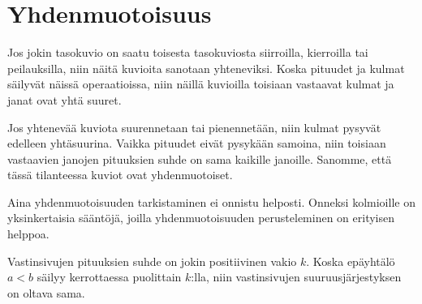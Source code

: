 \section*{Yhdenmuotoisuus}

Jos jokin tasokuvio on saatu toisesta tasokuviosta siirroilla, kierroilla tai
peilauksilla, niin näitä kuvioita sanotaan yhteneviksi. Koska pituudet ja kulmat säilyvät
näissä operaatioissa, niin näillä kuvioilla toisiaan vastaavat kulmat ja janat
ovat yhtä suuret.

Jos yhtenevää kuviota suurennetaan tai pienennetään, niin kulmat pysyvät edelleen yhtäsuurina.
Vaikka pituudet eivät pysykään samoina, niin toisiaan vastaavien janojen pituuksien suhde
on sama kaikille janoille. Sanomme, että tässä tilanteessa kuviot ovat yhdenmuotoiset.


Aina yhdenmuotoisuuden tarkistaminen ei onnistu helposti. Onneksi kolmioille on yksinkertaisia
sääntöjä, joilla yhdenmuotoisuuden perusteleminen on erityisen helppoa.


Vastinsivujen pituuksien suhde on jokin positiivinen vakio $k$. Koska
epäyhtälö $a < b$ säilyy kerrottaessa puolittain $k$:lla, niin vastinsivujen
suuruusjärjestyksen on oltava sama.

